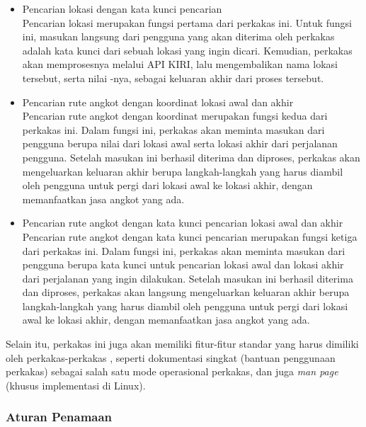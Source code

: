\begin{itemize}
	\item Pencarian lokasi dengan kata kunci pencarian\\
	Pencarian lokasi merupakan fungsi pertama dari perkakas ini. Untuk fungsi ini, masukan langsung dari pengguna yang akan diterima oleh perkakas adalah kata kunci dari sebuah lokasi yang ingin dicari. Kemudian, perkakas akan memprosesnya melalui API KIRI, lalu mengembalikan nama lokasi tersebut, serta nilai \latlon -nya, sebagai keluaran akhir dari proses tersebut.
	\vfill\newpage %
	\item Pencarian rute angkot dengan koordinat \latlon\xspace lokasi awal dan akhir\\
	Pencarian rute angkot dengan koordinat merupakan fungsi kedua dari perkakas ini. Dalam fungsi ini, perkakas akan meminta masukan dari pengguna berupa nilai \latlon\xspace dari lokasi awal serta lokasi akhir dari perjalanan pengguna. Setelah masukan ini berhasil diterima dan diproses, perkakas akan mengeluarkan keluaran akhir berupa langkah-langkah yang harus diambil oleh pengguna untuk pergi dari lokasi awal ke lokasi akhir, dengan memanfaatkan jasa angkot yang ada.
	\item Pencarian rute angkot dengan kata kunci pencarian lokasi awal dan akhir\\
	Pencarian rute angkot dengan kata kunci pencarian merupakan fungsi ketiga  dari perkakas ini. Dalam fungsi ini, perkakas akan meminta masukan dari pengguna berupa kata kunci untuk pencarian lokasi awal dan lokasi akhir dari perjalanan yang ingin dilakukan. Setelah masukan ini berhasil diterima dan diproses, perkakas akan langsung mengeluarkan keluaran akhir berupa langkah-langkah yang harus diambil oleh pengguna untuk pergi dari lokasi awal ke lokasi akhir, dengan memanfaatkan jasa angkot yang ada.
\end{itemize}
\vspace{\baselineskip}\noindent %
Selain itu, perkakas ini juga akan memiliki fitur-fitur standar yang harus dimiliki oleh perkakas-perkakas \cl, seperti dokumentasi singkat (bantuan penggunaan perkakas) sebagai salah satu mode operasional perkakas, dan juga \textit{man page} (khusus implementasi di Linux).

\subsubsection{Aturan Penamaan}
\label{sec:analysis-thesisapp-features-conventions}

